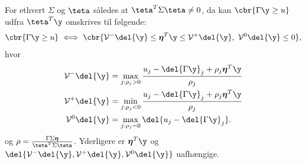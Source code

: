 %
\begin{lem} \label{lem:polyhedral}
For ethvert \(\Sigma\) og \(\teta\) således at \(\teta^T \Sigma \teta \neq 0\), da kan \(\cbr{\Gamma \y \geq u}\) udfra \(\teta^T \y\) omskrives til følgende:
\begin{align}
\cbr{\Gamma \y \geq u} \ \Longleftrightarrow \ \cbr{\mathcal{V}^- \del{\y} \leq \boldsymbol{\eta}^T \y \leq \mathcal{V}^+ \del{\y}, \  \mathcal{V}^0 \del{\y} \leq 0}, \label{eq:post_8}
\end{align}
hvor
\begin{align}
\mathcal{V}^- \del{\y} &= \max_{j: \rho_j > 0} \frac{u_j - \del{\Gamma \y}_j + \rho_j \boldsymbol{\eta}^T \y}{\rho_j} \label{eq:V-} \\
\mathcal{V}^+ \del{\y} &= \min_{j: \rho_j < 0} \frac{u_j - \del{\Gamma \y}_j + \rho_j \boldsymbol{\eta}^T \y}{\rho_j} \label{eq:V+} \\
\mathcal{V}^0 \del{\y} &= \max_{j: \rho_j = 0} \del{u_j - \del{\Gamma \y}_j}.  \label{eq:V0} 
\end{align}
og \(\rho=\frac{\Gamma \Sigma \boldsymbol{\eta}}{\teta^T \Sigma \teta}\).
Yderligere  er \(\boldsymbol{\eta}^T \y\) og \(\del{\mathcal{V}^-\del{\y}, \mathcal{V}^+\del{\y},\mathcal{V}^0\del{\y}}\) uafhængige. 
\end{lem}
